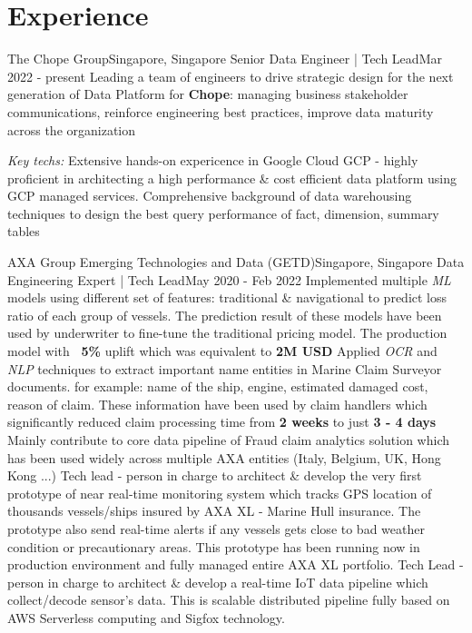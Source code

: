 \section{Experience}
  \resumeSubHeadingListStart

    \resumeSubheading
      {The Chope Group}{Singapore, Singapore}
      {Senior Data Engineer | Tech Lead}{Mar 2022 - present}
      \resumeItemListStart
          {Leading a team of engineers to drive strategic design for the next generation of Data Platform  for \textbf{Chope}: managing business stakeholder communications, reinforce engineering best practices, improve data maturity across the organization}
      \resumeItemListEnd
      
      \emph{Key techs:}
      \resumeItemListStart
          {Extensive hands-on expericence in Google Cloud GCP - highly proficient in architecting a high performance \& cost efficient data platform using GCP managed services.}
          {Comprehensive background of data warehousing techniques to design the best query performance of fact, dimension, summary tables}
      \resumeItemListEnd

    \resumeSubheading
      {AXA Group Emerging Technologies and Data (GETD)}{Singapore, Singapore}
      {Data Engineering Expert | Tech Lead}{May 2020 - Feb 2022}
      \resumeItemListStart
          {Implemented multiple \emph{ML} models using different set of features: traditional \& navigational to predict loss ratio of each group of vessels. The prediction result of these models have been used by underwriter to fine-tune the traditional pricing model. The production model with \textbf{~5\%} uplift which was equivalent to \textbf{2M USD}}
          {Applied \emph{OCR} and \emph{NLP} techniques to extract important name entities in Marine Claim Surveyor documents. for example: name of the ship, engine, estimated damaged cost, reason of claim. These information have been used by claim handlers which significantly reduced claim processing time from \textbf{2 weeks} to just \textbf{3 - 4 days}}
          {Mainly contribute to core data pipeline of Fraud claim analytics solution which has been used widely across multiple AXA entities (Italy, Belgium, UK, Hong Kong ...)}
          {Tech lead - person in charge to architect \& develop the very first prototype of near real-time monitoring system which tracks GPS location of thousands vessels/ships insured by AXA XL - Marine Hull insurance. The prototype also send real-time alerts if any vessels gets close to bad weather condition or precautionary areas. This prototype has been running now in production environment and fully managed entire AXA XL portfolio.}
          {Tech Lead - person in charge to architect \& develop a real-time IoT data pipeline which collect/decode sensor’s data. This is scalable distributed pipeline fully based on AWS Serverless computing and Sigfox technology.}
      \resumeItemListEnd

